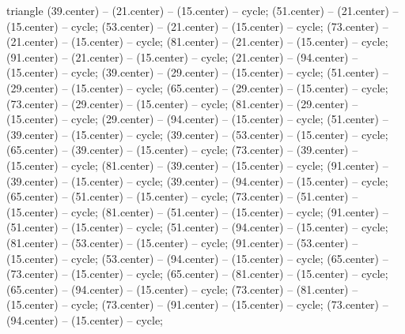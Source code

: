 \begin{pgfonlayer}{triangle}
 (39.center) -- (21.center) -- (15.center) -- cycle; 
 (51.center) -- (21.center) -- (15.center) -- cycle; 
 (53.center) -- (21.center) -- (15.center) -- cycle; 
 (73.center) -- (21.center) -- (15.center) -- cycle; 
 (81.center) -- (21.center) -- (15.center) -- cycle; 
 (91.center) -- (21.center) -- (15.center) -- cycle; 
 (21.center) -- (94.center) -- (15.center) -- cycle; 
 (39.center) -- (29.center) -- (15.center) -- cycle; 
 (51.center) -- (29.center) -- (15.center) -- cycle; 
 (65.center) -- (29.center) -- (15.center) -- cycle; 
 (73.center) -- (29.center) -- (15.center) -- cycle; 
 (81.center) -- (29.center) -- (15.center) -- cycle; 
 (29.center) -- (94.center) -- (15.center) -- cycle; 
 (51.center) -- (39.center) -- (15.center) -- cycle; 
 (39.center) -- (53.center) -- (15.center) -- cycle; 
 (65.center) -- (39.center) -- (15.center) -- cycle; 
 (73.center) -- (39.center) -- (15.center) -- cycle; 
 (81.center) -- (39.center) -- (15.center) -- cycle; 
 (91.center) -- (39.center) -- (15.center) -- cycle; 
 (39.center) -- (94.center) -- (15.center) -- cycle; 
 (65.center) -- (51.center) -- (15.center) -- cycle; 
 (73.center) -- (51.center) -- (15.center) -- cycle; 
 (81.center) -- (51.center) -- (15.center) -- cycle; 
 (91.center) -- (51.center) -- (15.center) -- cycle; 
 (51.center) -- (94.center) -- (15.center) -- cycle; 
 (81.center) -- (53.center) -- (15.center) -- cycle; 
 (91.center) -- (53.center) -- (15.center) -- cycle; 
 (53.center) -- (94.center) -- (15.center) -- cycle; 
 (65.center) -- (73.center) -- (15.center) -- cycle; 
 (65.center) -- (81.center) -- (15.center) -- cycle; 
 (65.center) -- (94.center) -- (15.center) -- cycle; 
 (73.center) -- (81.center) -- (15.center) -- cycle; 
 (73.center) -- (91.center) -- (15.center) -- cycle; 
 (73.center) -- (94.center) -- (15.center) -- cycle; 

\end{pgfonlayer}
